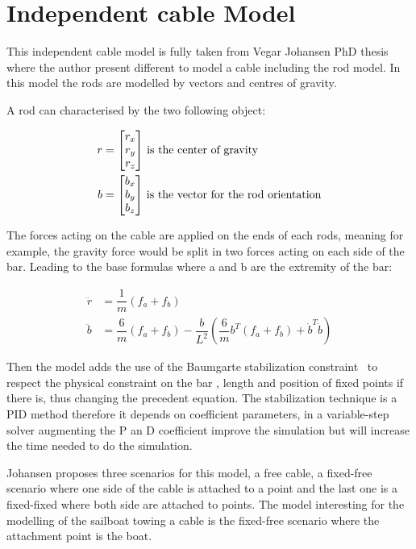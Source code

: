 \section{Independent cable Model}

This independent cable model is fully taken from  Vegar Johansen PhD thesis~\cite{johansen2007modelling} where the author present different to model a cable including the rod model. In this model the rods are modelled by vectors and centres of gravity.

A rod can characterised by the two following object:

\begin{align}
r &= \begin{bmatrix}
    r_x \\
    r_y \\
    r_z
\end{bmatrix}\, \textnormal{is the center of gravity}\\
b &= \begin{bmatrix}
    b_x \\
    b_y \\
    b_z
\end{bmatrix}\, \textnormal{is the vector for the rod orientation}
\end{align}

The forces acting on the cable are applied on the ends of each rods, meaning for example, the gravity force would be split in two forces acting on each side of the bar. Leading to the base formulas where a and b are the extremity of the bar:

\begin{align}
\ddot{r} &= \dfrac{1}{m}  (f_a+f_b) \\
\ddot{b} &=  \dfrac{6}{m}(f_a+f_b) - \dfrac{b}{L^{2}}  (\dfrac{6}{m}b^{T}(f_a+f_b)+\dot{b}^{T}\dot{b}) 
\end{align}

Then the model adds the use of the Baumgarte stabilization constraint~\cite{baumgarte1972stabilization} to respect the physical constraint on the bar , length and position of fixed points if there is, thus changing the precedent equation. 
The stabilization technique is a PID method therefore it depends on coefficient parameters, in a variable-step solver augmenting the P an D coefficient improve the simulation but will increase the time needed to do the simulation.

Johansen proposes three scenarios for this model, a free cable, a fixed-free scenario where one side of the cable is attached to a point and the last one is a fixed-fixed where both side are attached to points.
The model interesting for the modelling of the sailboat towing a cable is the fixed-free scenario where the attachment point is the boat.

